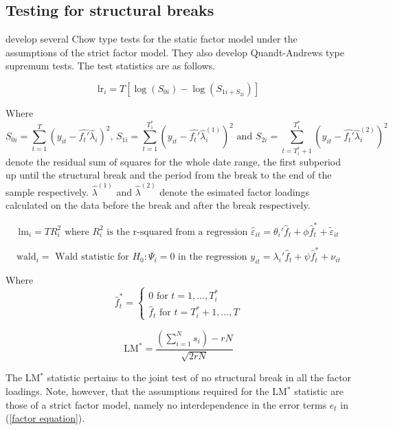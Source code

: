 \documentclass[11pt]{article}
\begin{document}
\subsection{Testing for structural breaks}
\citet{breitung2011testing} develop several Chow type tests for the static factor model under the assumptions of the strict factor model. They also develop Quandt-Andrews type supremum tests. The test statistics are as follows.


\begin{equation}
	\label{LR-Statistic}
	\text{lr}_i = T [ \log(S_{0i}) - \log(S_{1i + S_{2i}}) ]
\end{equation}

Where $$S_{0i} = \sum_{t=1}^{T}(y_{it} - \hat{f_t'} \hat \lambda_i)^2 \text{, } S_{1i} = \sum_{t=1}^{T_1^*}(y_{it} - \hat{f_t'} \hat \lambda_i^{(1)})^2 \text{ and } S_{2i} = \sum_{t=T^*_i+1}^{T_1^*}(y_{it} - \hat{f_t'} \hat \lambda_i^{(2)})^2 $$
denote the residual sum of squares for the whole date range, the first subperiod up until the structural break and the period from the break to the end of the sample respectively.
$\hat \lambda^{(1)}$ and $\hat \lambda^{(2)}$ denote the esimated factor loadings calculated on the data before the break and after the break respectively.

\begin{equation}
	\label{LM-Statistic}
	\text{lm}_i = T R^2_i \text{ where $R_i^2$ is the r-squared from a regression } \hat \varepsilon_{it} = \theta_i' \hat f_t + \phi \hat f_t^* + \tilde \varepsilon_{it}
\end{equation}

\begin{equation}
	\label{Wald-Statistic}
	\text{wald}_i = \text{ Wald statistic for $H_0: \Psi_i = 0$ in the regression } y_{it} = \lambda_i' \hat f_t + \psi \hat f_t^* + \nu_{it}
\end{equation}

Where 
$$\hat f_t^* = \begin{cases} 0 \text{ for } t=1, ..., T_i^* \\ \hat f_t \text{ for } t=T_i^*+1, ..., T \end{cases}$$

\begin{equation}
	\label{LM-Statistic}
	\text{LM}^* = \frac{\left( \sum_{i=1}^N s_i \right) -rN}{\sqrt{2rN}}
\end{equation}

The LM$^*$ statistic pertains to the joint test of no structural break in all the factor loadings. Note, however, that the assumptions required for the LM$^*$ statistic are those of a strict factor model, namely no interdependence in the error terms $e_t$ in (\ref{factor equation}).
\end{document}
